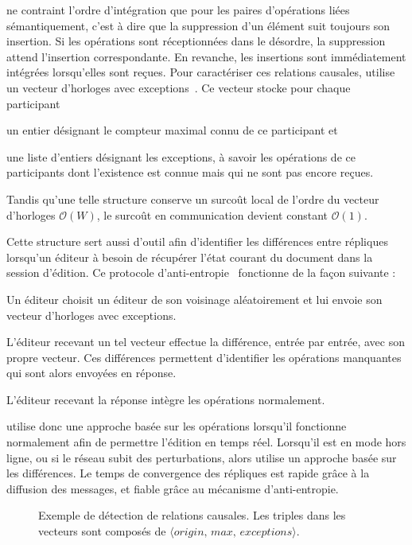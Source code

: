 \CRATE ne contraint l'ordre d'intégration que pour les paires d'opérations liées
sémantiquement, c'est à dire que la suppression d'un élément suit toujours son
insertion. Si les opérations sont réceptionnées dans le désordre, la suppression
attend l'insertion correspondante. En revanche, les insertions sont
immédiatement intégrées lorsqu'elles sont reçues. Pour caractériser ces
relations causales, \CRATE utilise un vecteur d'horloges avec
exceptions~\cite{malkhi2007concise, mukund2014optimized}. Ce vecteur stocke pour
chaque participant
\begin{inparaenum}
\item un entier désignant le compteur maximal connu de ce participant et
\item une liste d'entiers désignant les exceptions, à savoir les opérations de
  ce participants dont l'existence est connue mais qui ne sont pas encore
  reçues.
\end{inparaenum}
Tandis qu'une telle structure conserve un surcoût local de l'ordre du vecteur
d'horloges $\mathcal{O}(W)$, le surcoût en communication devient constant
$\mathcal{O}(1)$.

Cette structure sert aussi d'outil afin d'identifier les différences entre
répliques lorsqu'un éditeur à besoin de récupérer l'état courant du document
dans la session d'édition. Ce protocole
d'anti-entropie~\cite{demers1987epidemic} fonctionne de la façon suivante :
\begin{inparaenum}
\item Un éditeur choisit un éditeur de son voisinage aléatoirement et lui envoie
  son vecteur d'horloges avec exceptions.
\item L'éditeur recevant un tel vecteur effectue la différence, entrée par
  entrée, avec son propre vecteur. Ces différences permettent d'identifier les
  opérations manquantes qui sont alors envoyées en réponse.
\item L'éditeur recevant la réponse intègre les opérations normalement.
\end{inparaenum}

\CRATE utilise donc une approche basée sur les opérations lorsqu'il fonctionne
normalement afin de permettre l'édition en temps réel. Lorsqu'il est en mode
hors ligne, ou si le réseau subit des perturbations, alors \CRATE utilise un
approche basée sur les différences. Le temps de convergence des répliques est
rapide grâce à la diffusion des messages, et fiable grâce au mécanisme
d'anti-entropie.

\begin{figure}
  \begin{center}
    
    \caption[Exemple de détection de relations causales]
    {\label{editor:fig:timeline}Exemple de détection de relations causales. Les
      triples dans les vecteurs sont composés de
      $\langle origin,\, max,\, exceptions\rangle$.}
  \end{center}
\end{figure}

